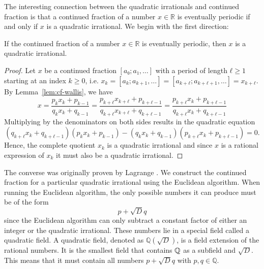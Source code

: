 The interesting connection between the quadratic irrationals and continued
fraction is that a continued fraction of a number $x ∈ ℝ$ is eventually
periodic if and only if $x$ is a quadratic irrational.
We begin with the first direction:

\begin{theorem}
  If the continued fraction of a number $x ∈ ℝ$ is eventually periodic, then $x$ is a quadratic irrational.
\end{theorem}

\begin{proof}
  Let $x$ be a continued fraction $[a₀; a₁, …]$ with a period of length $ℓ ≥ 1$
  starting at an index $k ≥ 0$,
  i.e. $x_k = [a_k; a_{k+1}, …] = [a_{k+ℓ}; a_{k+ℓ+1}, …] = x_{k+ℓ}$.
  By Lemma~\ref{lem:cf-wallis}, we have
  \[
    x
    = \frac{p_k x_k + p_{k-1}}{q_k x_k + q_{k-1}}
    = \frac{p_{k+ℓ} x_{k+ℓ} + p_{k+ℓ-1}}{q_{k+ℓ} x_{k+ℓ} + q_{k+ℓ-1}}
    = \frac{p_{k+ℓ} x_k + p_{k+ℓ-1}}{q_{k+ℓ} x_k + q_{k+ℓ-1}}
  \]
  Multiplying by the denominators on both sides results in the quadratic equation
  \[
    (q_{k+ℓ} x_k + q_{k+ℓ-1})(p_k x_k + p_{k-1}) - (q_k x_k + q_{k-1}) (p_{k+ℓ} x_k + p_{k+ℓ-1}) = 0.
  \]
  Hence, the complete quotient $x_k$ is a quadratic irrational and
  since $x$ is a rational expression of $x_k$ it must also be a quadratic irrational.
\end{proof}

The converse was originally proven by Lagrange \cite{Lagrange70}.
We construct the continued fraction for a particular quadratic irrational using
the Euclidean algorithm.
When running the Euclidean algorithm,
the only possible numbers it can produce must be of the form
\[
  p + \sqrt{D} q
\]
since the Euclidean algorithm can only subtract a constant factor of either an
integer or the quadratic irrational.
These numbers lie in a special field called a quadratic field.
A quadratic field, denoted as $ℚ(\sqrt{D})$, is a field extension of the rational numbers.
It is the smallest field that contains ${\mathbb Q}$ as a subfield and $\sqrt{D}$.
This means that it must contain all numbers $p + \sqrt{D} q$ with $p, q ∈ ℚ$.

